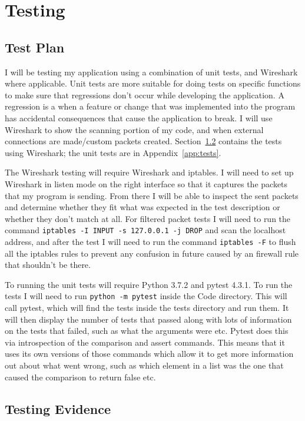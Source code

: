 \documentclass[titlepage]{article}
\let\Oldsection\section{}
\renewcommand{\section}{\clearpage\FloatBarrier\Oldsection}
\let\Oldsubsection\subsection{}
\renewcommand{\subsection}{\FloatBarrier\Oldsubsection}
\begin{document}
\section{Testing}

\subsection{Test Plan}

I will be testing my application using a combination of unit tests,
and Wireshark where applicable.
Unit tests are more suitable for doing tests on specific functions to make sure
that regressions don't occur while developing the application.
A regression is a when a feature or change that was implemented into the program 
has accidental consequences that cause the application to break.
I will use Wireshark to show the scanning portion of my code,
and when external connections are made/custom packets created.
Section~\ref{wiresharktests} contains the tests using Wireshark;
the unit tests are in Appendix~\ref{app:tests}.

The Wireshark testing will require Wireshark and iptables.
I will need to set up Wireshark in listen mode on the right interface so that it
captures the packets that my program is sending.
From there I will be able to inspect the sent packets and determine whether they fit
what was expected in the test description or whether they don't match at all.
For filtered packet tests I will need to run the command \verb|iptables -I INPUT -s 127.0.0.1 -j DROP|
and scan the localhost address, and after the test I will need to run the command \verb|iptables -F| 
to flush all the iptables rules to prevent any confusion in future caused by an firewall rule
that shouldn't be there.

To running the unit tests will require Python 3.7.2 and pytest 4.3.1.
To run the tests I will need to run \verb|python -m pytest| inside the Code directory.
This will call pytest,
which will find the tests inside the tests directory and run them.
It will then display the number of tests that passed along with lots of information on the
tests that failed, such as what the arguments were etc.
Pytest does this via introspection of the comparison and assert commands.
This means that it uses its own versions of those commands which allow it to get more
information out about what went wrong,
such as which element in a list was the one that caused the comparison to return false etc.

\subsection{Testing Evidence}\label{wiresharktests}
\end{document}
